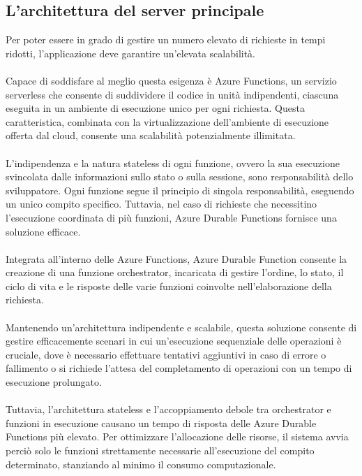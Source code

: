 \subsection{L’architettura del server principale}

Per poter essere in grado di gestire un numero elevato di richieste in tempi ridotti, l’applicazione deve garantire un’elevata scalabilità.\\
\\
Capace di soddisfare al meglio questa esigenza è Azure Functions, un servizio serverless che consente di suddividere il codice in unità indipendenti,
ciascuna eseguita in un ambiente di esecuzione unico per ogni richiesta.
Questa caratteristica, combinata con la virtualizzazione dell’ambiente di esecuzione offerta dal cloud, consente una scalabilità potenzialmente illimitata.\\
\\
L’indipendenza e la natura stateless di ogni funzione, ovvero la sua esecuzione svincolata dalle informazioni sullo stato o sulla sessione, sono responsabilità dello sviluppatore.
Ogni funzione segue il principio di singola responsabilità, eseguendo un unico compito specifico.
Tuttavia, nel caso di richieste che necessitino l’esecuzione coordinata di più funzioni, Azure Durable Functions fornisce una soluzione efficace.\\
\\
Integrata all’interno delle Azure Functions, Azure Durable Function consente la creazione di una funzione orchestrator,
incaricata di gestire l’ordine, lo stato, il ciclo di vita e le risposte delle varie funzioni coinvolte nell’elaborazione della richiesta.\\
\\
Mantenendo un'architettura indipendente e scalabile, questa soluzione consente di gestire efficacemente scenari in cui un’esecuzione sequenziale delle operazioni è cruciale,
dove è necessario effettuare tentativi aggiuntivi in caso di errore o fallimento o si richiede l'attesa del completamento di operazioni con un tempo di esecuzione prolungato.\\
\\
Tuttavia, l'architettura stateless e l’accoppiamento debole tra orchestrator e funzioni in esecuzione causano un tempo di risposta delle Azure Durable Functions più elevato.
Per ottimizzare l’allocazione delle risorse, il sistema avvia perciò solo le funzioni strettamente necessarie all’esecuzione del compito determinato,
stanziando al minimo il consumo computazionale.
\clearpage

